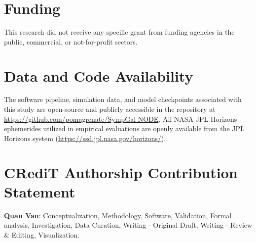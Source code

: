 \documentclass[preprint,12pt,3p]{elsarticle}
\begin{document}
\section*{Funding}
This research did not receive any specific grant from funding agencies in the public, commercial, or not-for-profit sectors.

\section*{Data and Code Availability}
The software pipeline, simulation data, and model checkpoints associated with this study are open-source and publicly accessible in the repository at \url{https://github.com/pomagrenate/SympGal-NODE}. All NASA JPL Horizons ephemerides utilized in empirical evaluations are openly available from the JPL Horizons system (\url{https://ssd.jpl.nasa.gov/horizons/}).

\section*{CRediT Authorship Contribution Statement}
\textbf{Quan Van}: Conceptualization, Methodology, Software, Validation, Formal analysis, Investigation, Data Curation, Writing - Original Draft, Writing - Review \& Editing, Visualization.



\end{document}
